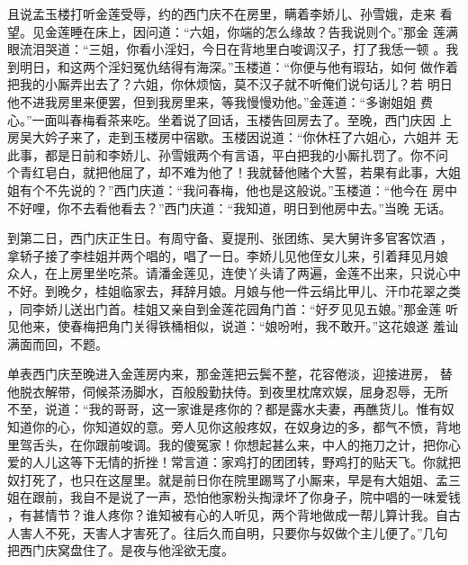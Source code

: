且说孟玉楼打听金莲受辱，约的西门庆不在房里，瞒着李娇儿、孙雪娥，走来
看望。见金莲睡在床上，因问道：“六姐，你端的怎么缘故？告我说则个。”那金
莲满眼流泪哭道：“三姐，你看小淫妇，今日在背地里白唆调汉子，打了我恁一顿
。我到明日，和这两个淫妇冤仇结得有海深。”玉楼道：“你便与他有瑕玷，如何
做作着把我的小厮弄出去了？六姐，你休烦恼，莫不汉子就不听俺们说句话儿？若
明日他不进我房里来便罢，但到我房里来，等我慢慢劝他。”金莲道：“多谢姐姐
费心。”一面叫春梅看茶来吃。坐着说了回话，玉楼告回房去了。至晚，西门庆因
上房吴大妗子来了，走到玉楼房中宿歇。玉楼因说道：“你休枉了六姐心，六姐并
无此事，都是日前和李娇儿、孙雪娥两个有言语，平白把我的小厮扎罚了。你不问
个青红皂白，就把他屈了，却不难为他了！我就替他赌个大誓，若果有此事，大姐
姐有个不先说的？”西门庆道：“我问春梅，他也是这般说。”玉楼道：“他今在
房中不好哩，你不去看他看去？”西门庆道：“我知道，明日到他房中去。”当晚
无话。

到第二日，西门庆正生日。有周守备、夏提刑、张团练、吴大舅许多官客饮酒
，拿轿子接了李桂姐并两个唱的，唱了一日。李娇儿见他侄女儿来，引着拜见月娘
众人，在上房里坐吃茶。请潘金莲见，连使丫头请了两遍，金莲不出来，只说心中
不好。到晚夕，桂姐临家去，拜辞月娘。月娘与他一件云绢比甲儿、汗巾花翠之类
，同李娇儿送出门首。桂姐又亲自到金莲花园角门首：“好歹见见五娘。”那金莲
听见他来，使春梅把角门关得铁桶相似，说道：“娘吩咐，我不敢开。”这花娘遂
羞讪满面而回，不题。

单表西门庆至晚进入金莲房内来，那金莲把云鬓不整，花容倦淡，迎接进房，
替他脱衣解带，伺候茶汤脚水，百般殷勤扶侍。到夜里枕席欢娱，屈身忍辱，无所
不至，说道：“我的哥哥，这一家谁是疼你的？都是露水夫妻，再醮货儿。惟有奴
知道你的心，你知道奴的意。旁人见你这般疼奴，在奴身边的多，都气不愤，背地
里驾舌头，在你跟前唆调。我的傻冤家！你想起甚么来，中人的拖刀之计，把你心
爱的人儿这等下无情的折挫！常言道：家鸡打的团团转，野鸡打的贴天飞。你就把
奴打死了，也只在这屋里。就是前日你在院里踢骂了小厮来，早是有大姐姐、孟三
姐在跟前，我自不是说了一声，恐怕他家粉头掏渌坏了你身子，院中唱的一味爱钱
，有甚情节？谁人疼你？谁知被有心的人听见，两个背地做成一帮儿算计我。自古
人害人不死，天害人才害死了。往后久而自明，只要你与奴做个主儿便了。”几句
把西门庆窝盘住了。是夜与他淫欲无度。

